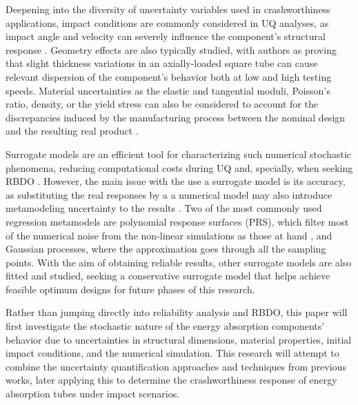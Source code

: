 \documentclass[12pt,number,preprint,review,times]{elsarticle}
\begin{document}
Deepening into the diversity of uncertainty variables used in crashworthiness applications, impact conditions are commonly considered in UQ analyses, as impact angle and velocity can severely influence the component's structural response \citep{ren_crashworthiness_2014}. Geometry effects are also typically studied, with authors as \citet{eichmueller_computer_2019} proving that slight thickness variations in an axially-loaded square tube can cause relevant dispersion of the component's behavior both at low and high testing speeds. Material uncertainties as the elastic and tangential moduli, Poisson's ratio, density, or the yield stress can also be considered to account for the discrepancies induced by the manufacturing process between the nominal design and the resulting real product \citep{sun2011crashworthiness,najafi2014multi}. %

Surrogate models are an efficient tool for characterizing such numerical stochastic phenomena, reducing computational costs during UQ and, specially, when seeking RBDO \citep{moustapha_adaptive_2015}. However, the main issue with the use a surrogate model is its accuracy, as substituting the real responses by a a numerical model may also introduce metamodeling uncertainty to the results \citep{zhang_concurrent_2013,qiu_crashworthiness_2018}. Two of the most commonly used regression metamodels are polynomial response surfaces (PRS), which filter most of the numerical noise from the non-linear simulations as those at hand \citep{papila2000response}, and Gaussian processes, where the approximation goes through all the sampling points. With the aim of obtaining reliable results, other surrogate models are also fitted and studied, seeking a conservative surrogate model that helps achieve feasible optimum designs \citep{pan_application_2013} for future phases of this research. 

Rather than jumping directly into reliability analysis and RBDO, this paper will first investigate the stochastic nature of the energy absorption components' behavior due to uncertainties in structural dimensions, material properties, initial impact conditions, and the numerical simulation. This research will attempt to combine the uncertainty quantification approaches and techniques from previous works, later applying this to determine the crashworthiness response of energy absorption tubes under impact scenarios. 
\end{document}
